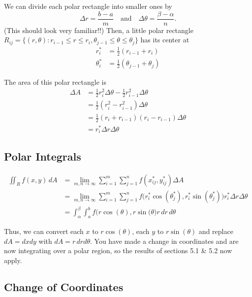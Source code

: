 We can divide each polar rectangle into smaller ones by
\[
  \Delta r = \frac{b-a}{m} \quad \text{and} \quad \Delta \theta = \frac{\beta-\alpha}{n}.
\]
(This should look very familiar!!) Then, a little polar rectangle \(R_{ij} = \{(r, \theta) : r_{i-1} \leq r \leq r_i, \theta_{j-1} \leq \theta \leq \theta_j\}\) has its center at
\begin{align*}
  r^*_i & = \frac{1}{2}(r_{i-1} + r_i) \\
  \theta^*_i & = \frac{1}{2}(\theta_{j-1} + \theta_j)
\end{align*}

The area of this polar rectangle is
\begin{align*}
  \Delta A & = \frac{1}{2}r_i^2 \Delta \theta - \frac{1}{2}r_{i-1}^2 \Delta \theta \\
           & = \frac{1}{2}\left(r_i^2 - r_{i-1}^2\right) \Delta \theta \\
           & = \frac{1}{2}(r_i + r_{i-1})(r_i - r_{i-1}) \Delta \theta \\
           & = r^*_i \Delta r \Delta \theta
\end{align*}

\subsection{Polar Integrals}

\begin{align*}
  \iint_{R}f(x,y) \, dA & = \lim_{m,n \to \infty} \sum_{i=1}^{m} \sum_{j=1}^{n} f(x^*_{ij}, y^*_{ij}) \Delta A \\
                        & = \lim_{m,n \to \infty} \sum_{i=1}^{m} \sum_{j=1}^{n} f\bigl(r^*_i \cos\left(\theta^*_j\right), r^*_i \sin\left(\theta^*_j\right)\bigr) r^*_i \Delta r \Delta \theta \\
                        & = \int_{\alpha}^{\beta} \int_{a}^{b} f\bigl(r \cos(\theta), r \sin(\theta \bigr) r \, dr \, d\theta
\end{align*}

Thus, we can convert each \(x\) to \(r \cos(\theta)\), each \(y\) to \(r \sin(\theta)\) and replace \(dA = dxdy\) with \(dA = r \, dr d\theta\). You have made a change in coordinates and are now integrating over a polar region, so the results of sections 5.1 \& 5.2 now apply.

\subsection{Change of Coordinates}

